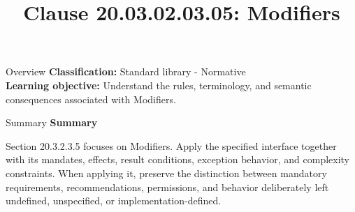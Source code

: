 \documentclass[10pt,letterpaper]{article}
\title{Clause 20.03.02.03.05: Modifiers}
\author{}
\date{}
\begin{document}
\maketitle
\begin{CornellOverviewBox}{Overview}
\textbf{Classification:} Standard library - Normative\\[2pt]
\textbf{Learning objective:} Understand the rules, terminology, and semantic consequences associated with Modifiers.
\end{CornellOverviewBox}\begin{CornellSummaryBox}{Summary}
{\sffamily\bfseries\color{Accent} Summary}\par\vspace{3pt}Section 20.3.2.3.5 focuses on Modifiers. Apply the specified interface together with its mandates, effects, result conditions, exception behavior, and complexity constraints. When applying it, preserve the distinction between mandatory requirements, recommendations, permissions, and behavior deliberately left undefined, unspecified, or implementation-defined.
\end{CornellSummaryBox}
\end{document}
